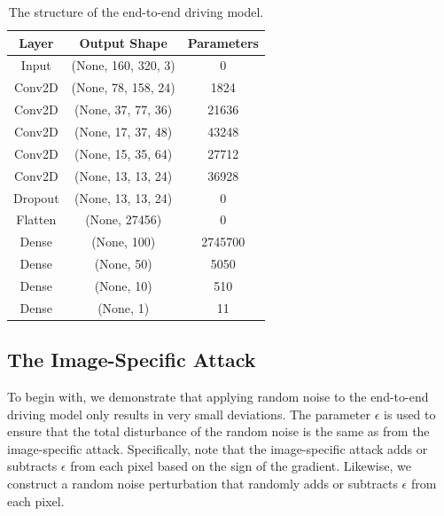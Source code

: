 \begin{table}[H]
\begin{center}
\begin{tabular}{ c c c }
     \hline
     Layer & Output Shape & Parameters \\ 
     \hline
     Input & (None, 160, 320, 3) & 0 \\  
     Conv2D & (None, 78, 158, 24) & 1824 \\  
     Conv2D & (None, 37, 77, 36) & 21636 \\  
     Conv2D & (None, 17, 37, 48) & 43248 \\  
     Conv2D & (None, 15, 35, 64) & 27712 \\  
     Conv2D & (None, 13, 13, 24) & 36928 \\
     Dropout & (None, 13, 13, 24) & 0 \\
     Flatten & (None, 27456) & 0 \\
     Dense & (None, 100) & 2745700 \\
     Dense & (None, 50) & 5050 \\
     Dense & (None, 10) & 510 \\
     Dense & (None, 1) & 11 \\
     \hline
    \end{tabular}
    \caption{The structure of the end-to-end driving model. \label{table_NVIDIA_model}}
\end{center}
\end{table}

\subsection{The Image-Specific Attack}

To begin with, we demonstrate that applying random noise to the end-to-end driving model only results in very small deviations. The parameter $\epsilon$ is used to ensure that the total disturbance of the random noise is the same as from the image-specific attack. Specifically, note that the image-specific attack adds or subtracts $\epsilon$ from each pixel based on the sign of the gradient. Likewise, we construct a random noise perturbation that randomly adds or subtracts $\epsilon$ from each pixel. 

